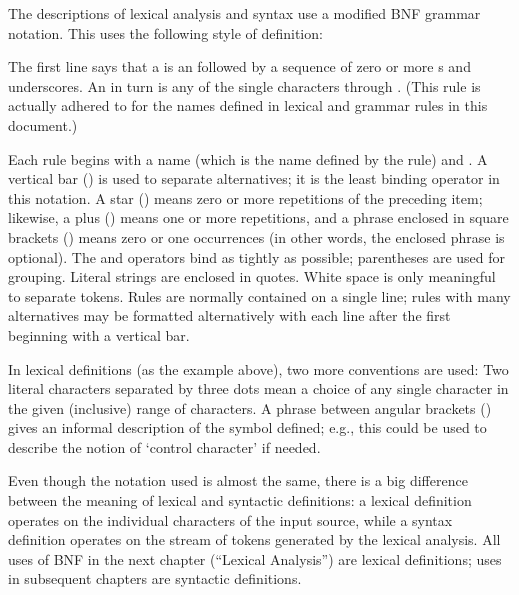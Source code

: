 The descriptions of lexical analysis and syntax use a modified BNF
grammar notation.  This uses the following style of definition:

\begin{productionlist}[*]
\end{productionlist}

The first line says that a  is an  followed by
a sequence of zero or more s and underscores.  An
 in turn is any of the single characters 
through .  (This rule is actually adhered to for the
names defined in lexical and grammar rules in this document.)

Each rule begins with a name (which is the name defined by the rule)
and \code{::=}.  A vertical bar (\code{|}) is used to separate
alternatives; it is the least binding operator in this notation.  A
star (\code{*}) means zero or more repetitions of the preceding item;
likewise, a plus (\code{+}) means one or more repetitions, and a
phrase enclosed in square brackets (\code{[ ]}) means zero or one
occurrences (in other words, the enclosed phrase is optional).  The
\code{*} and \code{+} operators bind as tightly as possible;
parentheses are used for grouping.  Literal strings are enclosed in
quotes.  White space is only meaningful to separate tokens.
Rules are normally contained on a single line; rules with many
alternatives may be formatted alternatively with each line after the
first beginning with a vertical bar.

In lexical definitions (as the example above), two more conventions
are used: Two literal characters separated by three dots mean a choice
of any single character in the given (inclusive) range of \ASCII{}
characters.  A phrase between angular brackets () gives an
informal description of the symbol defined; e.g., this could be used
to describe the notion of `control character' if needed.

Even though the notation used is almost the same, there is a big
difference between the meaning of lexical and syntactic definitions:
a lexical definition operates on the individual characters of the
input source, while a syntax definition operates on the stream of
tokens generated by the lexical analysis.  All uses of BNF in the next
chapter (``Lexical Analysis'') are lexical definitions; uses in
subsequent chapters are syntactic definitions.
